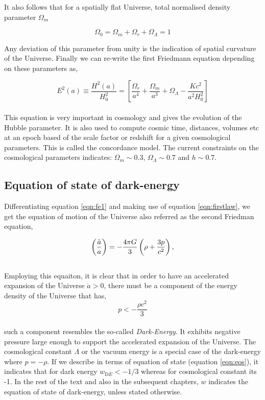 It also follows that for a spatially flat Universe, total normalised 
density parameter $\Omega_m$

\begin{equation}
	\Omega_0 = \Omega_m + \Omega_r + \Omega_{\Lambda} = 1
\end{equation}

Any deviation of this 
parameter from unity is the indication of spatial curvature of the Universe.
Finally we can re-write the first Friedmann equation depending on these parameters as,

\begin{equation}
	E^2(a) \equiv \dfrac{H^2(a)}{H_0^2} = \left[\dfrac{\Omega_r}{a^4}
	 + \dfrac{\Omega_m}{a^3} +
	 \Omega_{\Lambda} - \dfrac{Kc^2}{a^2H_0^2}  \right]
	 \label{eqn:hubbleparameter}
\end{equation}
\\
This equation is very important in cosmology and gives the evolution of the 
Hubble parameter. It is also used to compute cosmic time, distances, volumes
etc at an epoch based of the scale factor or redshift for a given cosmological
parameters. This is called the concordance model. The current constraints on the
cosmological parameters indicates: $\Omega_m \sim 0.3$, $\Omega_{\Lambda} \sim 0.7$
and $h \sim 0.7$.


\subsection{Equation of state of dark-energy}

Differentiating equation \ref{eqn:fe1} and making use of equation
\ref{eqn:firstlaw}, we get the equation of motion of the Universe
also referred as the second Friedman equation,

\begin{equation}
\centering
		\left( \dfrac{\ddot{a}}{a} \right) = -\dfrac{4 \pi G}{3} 
			\left( \rho + \dfrac{3p}{c^2} \right),
\label{eqn:fe2}
\end{equation}
\\
Employing this equaiton, it is clear that in order to have an 
accelerated expansion of the Universe $\ddot{a}>0$,
there must be a component of the energy density of the Universe that has,
\begin{equation}
	p < -\dfrac{\rho c^2}{3} 
\end{equation}
\\
such a component resembles the so-called {\it Dark-Energy}. It exhibits 
negative pressure large enough to support the accelerated expansion of the
Universe. The cosmological constant $\Lambda$  or the vacuum energy is a 
special case of the dark-energy where $p=-\rho$. If we describe in terms 
of equation of state (equation \ref{eqn:eos}), it indicates that for 
dark energy $w_{\mathrm DE}<-1/3$ whereas for cosmological constant its -1.
In the rest of the text and also in the subsequent chapters, $w$ indicates
the equation of state of dark-energy, unless stated otherwise.


